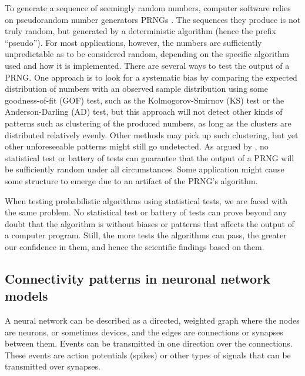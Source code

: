 To generate a sequence of seemingly random numbers, computer software relies on pseudorandom number generators PRNGs . The sequences they produce is not truly random, but generated by a deterministic algorithm (hence the prefix ``pseudo''). For most applications, however, the numbers are sufficiently unpredictable as to be considered random, depending on the specific algorithm used and how it is implemented. There are several ways to test the output of a PRNG. One approach is to look for a systematic bias by comparing the expected distribution of numbers with an observed sample distribution using some goodness-of-fit (GOF) test, such as the Kolmogorov-Smirnov (KS) test or the Anderson-Darling (AD) test, but this approach will not detect other kinds of patterns such as clustering of the produced numbers, as long as the clusters are distributed relatively evenly. Other methods may pick up such clustering, but yet other unforeseeable patterns might still go undetected. As argued by , no statistical test or battery of tests can guarantee that the output of a PRNG will be sufficiently random under all circumstances. Some application might cause some structure to emerge due to an artifact of the PRNG's algorithm. 

When testing probabilistic algorithms using statistical tests, we are faced with the same problem. No statistical test or battery of tests can prove beyond any doubt that the algorithm is without biases or patterns that affects the output of a computer program. Still, the more tests the algorithms can pass, the greater our confidence in them, and hence the scientific findings based on them. 


\subsection*{Connectivity patterns in neuronal network models}

A neural network can be described as a directed, weighted graph where the nodes are neurons, or sometimes devices, and the edges are connections or synapses between them. Events can be transmitted in one direction over the connections. These events are action potentials (spikes) or other types of signals that can be transmitted over synapses.

